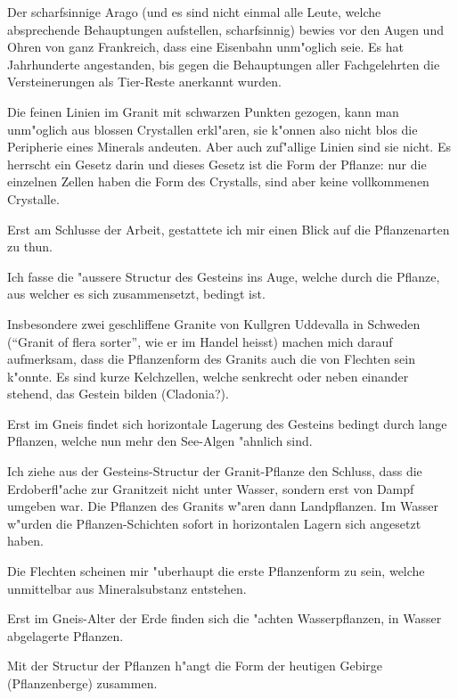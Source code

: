 \documentclass[a4paper, 11pt, oneside, german]{article}
\begin{document}
Der scharfsinnige Arago (und es sind nicht einmal alle Leute, welche absprechende Behauptungen aufstellen, scharfsinnig) bewies vor den Augen und Ohren von ganz Frankreich, dass eine Eisenbahn unm"oglich seie. Es hat Jahrhunderte angestanden, bis gegen die Behauptungen aller Fachgelehrten die Versteinerungen als Tier-Reste anerkannt wurden.

Die feinen Linien im Granit mit schwarzen Punkten gezogen, kann man unm"oglich aus blossen Crystallen erkl"aren, sie k"onnen also nicht blos die Peripherie eines Minerals andeuten. Aber auch zuf"allige Linien sind sie nicht. Es herrscht ein Gesetz darin und dieses Gesetz ist die Form der Pflanze: nur die einzelnen Zellen haben die Form des Crystalls, sind aber keine vollkommenen Crystalle.

Erst am Schlusse der Arbeit, gestattete ich mir einen Blick auf die Pflanzenarten zu thun.

Ich fasse die "aussere Structur des Gesteins ins Auge, welche durch die Pflanze, aus welcher es sich zusammensetzt, bedingt ist.

Insbesondere zwei geschliffene Granite von Kullgren Uddevalla in Schweden ("`Granit of flera sorter"', wie er im Handel heisst) machen mich darauf aufmerksam, dass die Pflanzenform des Granits auch die von Flechten sein k"onnte. Es sind kurze Kelchzellen, welche senkrecht oder neben einander stehend, das Gestein bilden (Cladonia?).

Erst im Gneis findet sich horizontale Lagerung des Gesteins bedingt durch lange Pflanzen, welche nun mehr den See-Algen "ahnlich sind.

Ich ziehe aus der Gesteins-Structur der Granit-Pflanze den Schluss, dass die Erdoberfl"ache zur Granitzeit nicht unter Wasser, sondern erst von Dampf umgeben war. Die Pflanzen des Granits w"aren dann Landpflanzen. Im Wasser w"urden die Pflanzen-Schichten sofort in horizontalen Lagern sich angesetzt haben.

Die Flechten scheinen mir "uberhaupt die erste Pflanzenform zu sein, welche unmittelbar aus Mineralsubstanz entstehen.

Erst im Gneis-Alter der Erde finden sich die "achten Wasserpflanzen, in Wasser abgelagerte Pflanzen.

Mit der Structur der Pflanzen h"angt die Form der heutigen Gebirge (Pflanzenberge) zusammen.
\end{document}
